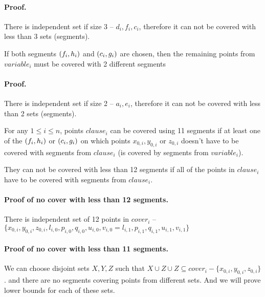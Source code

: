 \paragraph{Proof.}
There is independent set if size 3 -- $d_i, f_i, c_i$, therefore it can
not be covered with less than 3 sets (segments).


\begin{lemma}
\label{choose_variables_both}
If both segments $(f_i, h_i)$ and $(c_i, g_i)$ are chosen, then
the remaining points from $variable_i$ must be covered with 2 different
segments
\end{lemma}
\paragraph{Proof.}
There is independent set if size 2 -- $a_i, e_i$, therefore it can
not be covered with less than 2 sets (segments).


\begin{lemma}
\label{cover_clauses_segments_no_less}
For any $1 \le i \le n$, points $clause_i$
can be covered using 11 segments if at least one of the $(f_i, h_i)$
or $(c_i, g_i)$ on which points $x_{0, i}, y_{0, i}$ or $z_{0, i}$
doesn't have to be covered with segments from $clause_i$ (is covered by
segments from $variable_i$).

They can not be covered with less than 12 segments if all of the points
in $clause_i$ have to be covered with segments from $clause_i$.
\end{lemma}


\paragraph{Proof of no cover with less than 12 segments.}
There is independent set of 12 points in $cover_i$ -- 
$\{ x_{0, i}, y_{0, i}, z_{0, i}, l_{i, 0}, p_{i, 0}, q_{i, 0}, u_{i, 0}, v_{i, 0} = l_{i, 1},
 p_{i, 1}, q_{i, 1}, u_{i, 1}, v_{i, 1} \}$

\paragraph{Proof of no cover with less than 11 segments.}

We can choose disjoint sets $X, Y, Z$ such that
$X \cup Z \cup Z \subseteq cover_i - \{x_{0, i}, y_{0, i}, z_{0, i}\}$.
and there are no segments covering points from different sets.
And we will prove lower bounds for each of these sets.

